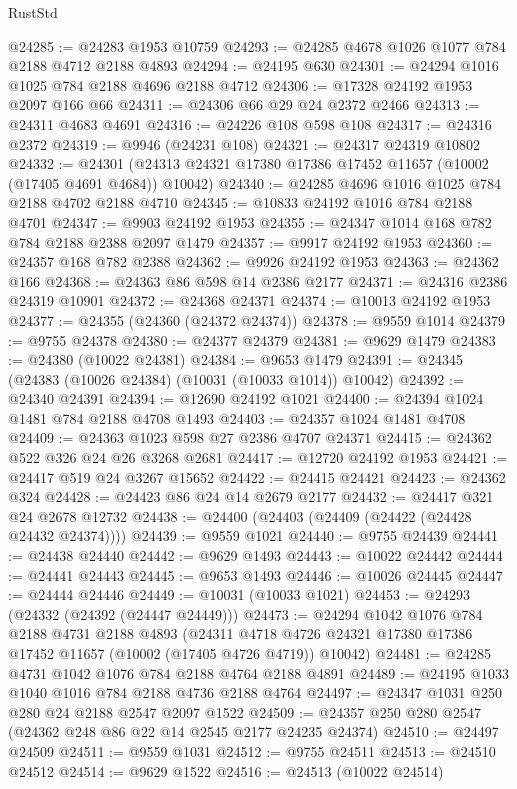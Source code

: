 \begin{lexlean}{RustStd}
\begin{coremodule}
@24285 := @24283 @1953 @10759
@24293 := @24285 @4678 @1026 @1077 @784 @2188 @4712 @2188 @4893
@24294 := @24195 @630
@24301 := @24294 @1016 @1025 @784 @2188 @4696 @2188 @4712
@24306 := @17328 @24192 @1953 @2097 @166 @66
@24311 := @24306 @66 @29 @24 @2372 @2466
@24313 := @24311 @4683 @4691
@24316 := @24226 @108 @598 @108
@24317 := @24316 @2372
@24319 := @9946 (@24231 @108)
@24321 := @24317 @24319 @10802
@24332 := @24301 (@24313 @24321 @17380 @17386 @17452 @11657 (@10002 (@17405 @4691 @4684)) @10042)
@24340 := @24285 @4696 @1016 @1025 @784 @2188 @4702 @2188 @4710
@24345 := @10833 @24192 @1016 @784 @2188 @4701
@24347 := @9903 @24192 @1953
@24355 := @24347 @1014 @168 @782 @784 @2188 @2388 @2097 @1479
@24357 := @9917 @24192 @1953
@24360 := @24357 @168 @782 @2388
@24362 := @9926 @24192 @1953
@24363 := @24362 @166
@24368 := @24363 @86 @598 @14 @2386 @2177
@24371 := @24316 @2386 @24319 @10901
@24372 := @24368 @24371
@24374 := @10013 @24192 @1953
@24377 := @24355 (@24360 (@24372 @24374))
@24378 := @9559 @1014
@24379 := @9755 @24378
@24380 := @24377 @24379
@24381 := @9629 @1479
@24383 := @24380 (@10022 @24381)
@24384 := @9653 @1479
@24391 := @24345 (@24383 (@10026 @24384) (@10031 (@10033 @1014)) @10042)
@24392 := @24340 @24391
@24394 := @12690 @24192 @1021
@24400 := @24394 @1024 @1481 @784 @2188 @4708 @1493
@24403 := @24357 @1024 @1481 @4708
@24409 := @24363 @1023 @598 @27 @2386 @4707 @24371
@24415 := @24362 @522 @326 @24 @26 @3268 @2681
@24417 := @12720 @24192 @1953
@24421 := @24417 @519 @24 @3267 @15652
@24422 := @24415 @24421
@24423 := @24362 @324
@24428 := @24423 @86 @24 @14 @2679 @2177
@24432 := @24417 @321 @24 @2678 @12732
@24438 := @24400 (@24403 (@24409 (@24422 (@24428 @24432 @24374))))
@24439 := @9559 @1021
@24440 := @9755 @24439
@24441 := @24438 @24440
@24442 := @9629 @1493
@24443 := @10022 @24442
@24444 := @24441 @24443
@24445 := @9653 @1493
@24446 := @10026 @24445
@24447 := @24444 @24446
@24449 := @10031 (@10033 @1021)
@24453 := @24293 (@24332 (@24392 (@24447 @24449)))
@24473 := @24294
    @1042
    @1076
    @784
    @2188
    @4731
    @2188
    @4893
    (@24311 @4718 @4726 @24321 @17380 @17386 @17452 @11657 (@10002 (@17405 @4726 @4719)) @10042)
@24481 := @24285 @4731 @1042 @1076 @784 @2188 @4764 @2188 @4891
@24489 := @24195 @1033 @1040 @1016 @784 @2188 @4736 @2188 @4764
@24497 := @24347 @1031 @250 @280 @24 @2188 @2547 @2097 @1522
@24509 := @24357 @250 @280 @2547 (@24362 @248 @86 @22 @14 @2545 @2177 @24235 @24374)
@24510 := @24497 @24509
@24511 := @9559 @1031
@24512 := @9755 @24511
@24513 := @24510 @24512
@24514 := @9629 @1522
@24516 := @24513 (@10022 @24514)

\end{coremodule}
\end{lexlean}
